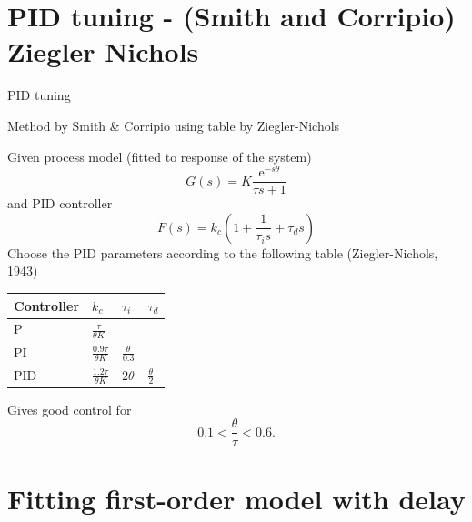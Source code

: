 \documentclass[presentation,aspectratio=169, usenames, dvipsnames]{beamer}
\begin{document}
\section{PID tuning - (Smith and Corripio) Ziegler Nichols}
\label{sec:org6876af3}
\begin{frame}[label={sec:orge39419e}]{PID tuning}
\end{frame}
\begin{frame}[label={sec:org4cbe8c0}]{Method by Smith \& Corripio using table by Ziegler-Nichols}
\small

Given process model (fitted to response of the system) \[ G(s) = K \frac{\mathrm{e}^{-s\theta}}{\tau s + 1} \] and PID controller
   \[ F(s) = k_c\left( 1 + \frac{1}{\tau_i s} + \tau_d s\right) \]
   Choose the PID parameters according to the following table (Ziegler-Nichols, 1943)
   \begin{center}
   \setlength{\tabcolsep}{20pt}
   \renewcommand{\arraystretch}{1.5}
   \begin{tabular}{llll}
   Controller & \(k_c\) & \(\tau_i\) & \(\tau_d\)\\
  \hline\hline
  P & \(\frac{\tau}{\theta K}\) &  & \\
  PI & \(\frac{0.9\tau}{\theta K}\) & \(\frac{\theta}{0.3}\) & \\
  PID & \(\frac{1.2\tau}{\theta K}\) & \(2\theta\) & \(\frac{\theta}{2}\)\\
  \hline
\end{tabular}
\end{center}

Gives good control for \[0.1 < \frac{\theta}{\tau} < 0.6.\]
\end{frame}

\section{Fitting first-order model with delay}
\label{sec:org9231777}
\end{document}
